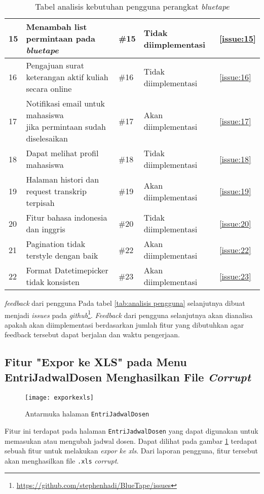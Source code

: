 \begin{table}[H]
{\begin{tabular}{|l|l|l|l|l|}
	15 & Menambah list permintaan pada \textit{bluetape} & \#15 & Tidak diimplementasi & \ref{issue:15} \\ \hline
	16 & Pengajuan surat keterangan aktif kuliah secara online & \#16 & Tidak diimplementasi & \ref{issue:16} \\ \hline
	17 & \makecell[l]{Notifikasi email untuk mahasiswa \\ jika permintaan sudah diselesaikan} & \#17 & Akan diimplementasi &  \ref{issue:17}\\ \hline
	18 & Dapat melihat profil mahasiswa & \#18 & Tidak diimplementasi & \ref{issue:18}\\ \hline
	19 & Halaman histori dan request transkrip terpisah & \#19 & Akan diimplementasi & \ref{issue:19}\\ \hline
	20 & Fitur bahasa indonesia dan inggris &  \#20 & Tidak diimplementasi & \ref{issue:20} \\ \hline
	21 & Pagination tidak terstyle dengan baik & \#22 & Akan diimplementasi & \ref{issue:22}\\ \hline
	22 & Format Datetimepicker tidak konsisten &\#23 & Akan diimplementasi & \ref{issue:23}\\ \hline
	
	
	\end{tabular}}
	\caption{Tabel analisis kebutuhan pengguna perangkat \textit{bluetape}}
\end{table}


\textit{feedback} dari pengguna Pada tabel \ref{tab:analisis pengguna} selanjutnya dibuat menjadi \textit{issues} pada \textit{github}\footnote{\url{https://github.com/stephenhadi/BlueTape/issues}}. \textit{Feedback} dari pengguna selanjutnya akan dianalisa apakah akan diimplementasi berdasarkan jumlah fitur yang dibutuhkan agar feedback tersebut dapat berjalan dan waktu pengerjaan.


\subsection{Fitur "Expor ke XLS" pada Menu EntriJadwalDosen Menghasilkan File  \textit{Corrupt}}
\label{issue:1}
\begin{figure}[H]
	\centering
	\texttt{[image: exporkexls]} 
	\caption{Antarmuka halaman \texttt{EntriJadwalDosen}}
	\label{fig:EntriJadwalDosen} 
\end{figure}

Fitur ini terdapat pada halaman \texttt{EntriJadwalDosen} yang dapat digunakan untuk memasukan atau mengubah jadwal dosen. Dapat dilihat pada gambar \ref{fig:EntriJadwalDosen} terdapat sebuah fitur untuk melakukan \textit{expor ke xls}. Dari laporan pengguna, fitur tersebut akan menghasilkan file \texttt{.xls} \textit{corrupt}.

